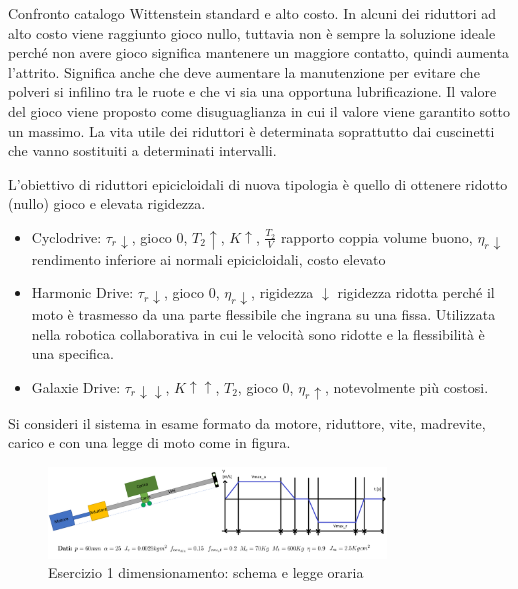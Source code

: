 Confronto catalogo Wittenstein standard e alto costo. In alcuni dei riduttori ad alto costo viene raggiunto gioco nullo, tuttavia non è sempre la soluzione ideale perché non avere gioco significa mantenere un maggiore contatto, quindi aumenta l'attrito. Significa anche che deve aumentare la manutenzione per evitare che polveri si infilino tra le ruote e che vi sia una opportuna lubrificazione. 
Il valore del gioco viene proposto come disuguaglianza in cui il valore viene garantito sotto un massimo.
La vita utile dei riduttori è determinata soprattutto dai cuscinetti che vanno sostituiti a determinati intervalli.

L'obiettivo di riduttori epicicloidali di nuova tipologia è quello di ottenere ridotto (nullo) gioco e elevata rigidezza.
\begin{itemize}
    \item Cyclodrive: \( \tau_r \downarrow \), gioco 0, \( T_2 \uparrow \), \( K \uparrow \), \( \frac{T_2}{V} \) rapporto coppia volume buono, \( \eta_r \downarrow \) rendimento inferiore ai normali epicicloidali, costo elevato
    \item Harmonic Drive: \( \tau_r \downarrow \), gioco 0, \( \eta_r \downarrow \), rigidezza \( \downarrow \) rigidezza ridotta perché il moto è trasmesso da una parte flessibile che ingrana su una fissa. Utilizzata nella robotica collaborativa in cui le velocità sono ridotte e la flessibilità è una specifica.
    \item Galaxie Drive: \( \tau_r \downarrow\downarrow\), \( K \uparrow\uparrow \), \( T_2 \), gioco 0, \( \eta_r \uparrow \), notevolmente più costosi.
\end{itemize}

Si consideri il sistema in esame formato da motore, riduttore, vite, madrevite, carico e con una legge di moto come in figura.

\begin{figure}[h]
    \centering
    \includegraphics[width=0.8\textwidth]{Immagini/esercizio1_dim_rid_vite.png}
    \caption{Esercizio 1 dimensionamento: schema e legge oraria}
\end{figure}

